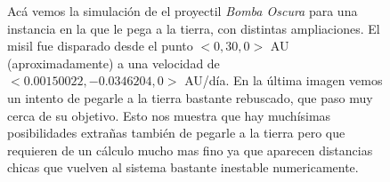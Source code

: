 \begin{figure}
{	\label{fig:res_bomba_3}
	}
	\caption{
		Acá vemos la simulación de el proyectil \textit{Bomba Oscura} para una instancia en la que le pega a la tierra,
		con distintas ampliaciones.
		El misil fue disparado desde el punto $<0,30,0>$ AU (aproximadamente) a una velocidad de $<0.00150022,-0.0346204,0>$ AU/día.
		En la última imagen vemos un intento de pegarle a la tierra bastante rebuscado, que paso muy cerca de su objetivo.
		Esto nos muestra que hay muchísimas posibilidades extrañas también de pegarle a la tierra pero que requieren de un cálculo mucho mas fino ya que
		aparecen distancias chicas que vuelven al sistema bastante inestable numericamente.
	}
	\label{ fig:res_bomba }
\end{figure}
